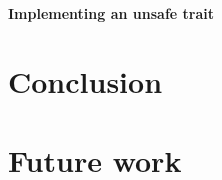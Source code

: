 \documentclass[twocolumn]{article}
\begin{document}
\paragraph{Implementing an unsafe trait}
\section{Conclusion}
\section{Future work}







\end{document}
